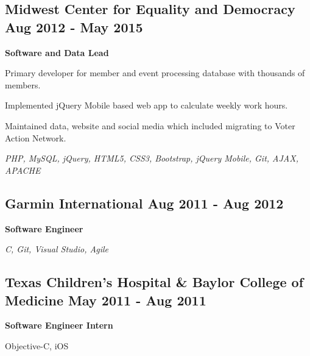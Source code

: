 \documentclass[letterpaper]{article}
\renewenvironment{itemize}{
  \begin{list}{}{
    \setlength{\leftmargin}{1.5em}
  }
}{
  \end{list}
}
\begin{document}
\subsection*{Midwest Center for Equality and Democracy \hfill Aug 2012 - May 2015}
\begin{itemize}
\item \textbf{Software and Data Lead}
\item Primary developer for member and event processing database with thousands of members.
\item Implemented jQuery Mobile based web app to calculate weekly work hours.
\item Maintained data, website and social media which included migrating to Voter Action Network.
  \begin{itemize}
  \item \textit{PHP, MySQL, jQuery, HTML5, CSS3, Bootstrap, jQuery Mobile, Git, AJAX, APACHE}
  \end{itemize}
\end{itemize}

\subsection*{Garmin International \hfill Aug 2011 - Aug 2012}
\begin{itemize}
\item \textbf{Software Engineer}
  \begin{itemize}
  \item \textit{C, Git, Visual Studio, Agile}
  \end{itemize}
\end{itemize}

\subsection*{Texas Children's Hospital \& Baylor College of Medicine \hfill May 2011 - Aug 2011}
\begin{itemize}
\item \textbf{Software Engineer Intern}
  \begin{itemize}
  \item Objective-C, iOS
  \end{itemize}
\end{itemize}
\end{document}

